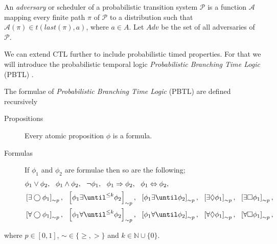 \begin{defi}[Adversary]
An \emph{adversary} or scheduler of a probabilistic transition system $\mathcal{P}$ is a function $\mathcal{A}$ mapping every finite path $\pi$ of $\mathcal{P}$ to a distribution such that $\mathcal{A}(\pi)\in t(last(\pi),a)$, where $a\in A$. Let $Adv$ be the set of all adversaries of $\mathcal{P}$.
\end{defi}


We can extend CTL further to include probabilistic timed properties. For that we will introduce the probabilistic temporal logic \emph{Probabilistic Branching Time Logic} (PBTL) \cite{Baier1998}.

\begin{defi}
The formulae of \emph{Probabilistic Branching Time Logic} (PBTL) are defined recursively
\begin{description}
    \item[Propositions]{Every atomic proposition $\phi$ is a formula.}
    \item[Formulas]{If $\phi_{1}$ and $\phi_{2}$ are formulae then so are the following;
    \begin{align*}
        & \phi_{1} \lor \phi_{2},\ \ \phi_{1} \land \phi_{2}, \ \ \lnot \phi_{1}, \ \ \phi_{1} \Rightarrow \phi_{2},\ \ \phi_{1} \Leftrightarrow \phi_{2}, \\
        & \left[\exists\bigcirc \phi_{1}\right]_{\sim p}, \ \
          \left[\phi_{1} \exists\until^{\leq k} \phi_{2}\right]_{\sim p}, \ \
          \left[\phi_{1} \exists\until \phi_{2}\right]_{\sim p}, \ \
          \left[\exists\lozenge \phi_{1}\right]_{\sim p}, \ \
          \left[\exists\square \phi_{1}\right]_{\sim p}, \\
        & \left[\forall\bigcirc \phi_{1}\right]_{\sim p}, \ \
          \left[\phi_{1} \forall\until^{\leq k} \phi_{2}\right]_{\sim p}, \ \
          \left[\phi_{1} \forall\until \phi_{2}\right]_{\sim p}, \ \
          \left[\forall\lozenge \phi_{1}\right]_{\sim p}, \ \
          \left[\forall\square \phi_{1}\right]_{\sim p},
        \end{align*}}
\end{description}
where $p\in[0,1]$, $\sim\in\{\geq,>\}$ and $k\in\mathbb{N}\cup\{0\}$.
\end{defi}

